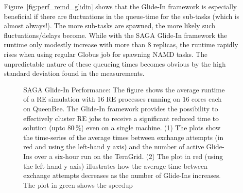 \documentclass{llncs}
\begin{document}
Figure~\ref{fig:perf_remd_glidin} shows that the Glide-In framework is
especially beneficial if there are fluctuations in the queue-time for
the sub-tasks (which is almost always!). The more sub-tasks are
spawned, the more likely such fluctuations/delays become. While with
the SAGA Glide-In framework the runtime only modestly increase with
more than 8 replicas, the runtime rapidly rises when using regular
Globus job for spawning NAMD tasks. The unpredictable nature of these
queueing times becomes obvious by the high standard deviation found in
the measurements.

\begin{figure}[htbp]
  \caption{SAGA Glide-In Performance: The figure shows the average
    runtime of a RE simulation with 16 RE processes running on 16
    cores each on QueenBee.  The Glide-In framework provides the
    possibility to effectively cluster RE jobs to receive a
    significant reduced time to solution (upto
    80\,\%) even on a single machine.
    (1) The plots show the time-series of the average times between
    exchange attempts (in red and using the left-hand y axis) and the
    number of active Glide-Ins over a six-hour run on the TeraGrid.
    (2) The plot in red (using the left-hand y axis) illustrates how
    the average time between exchange attempts decreases as the number
    of Glide-Ins increases. The plot in green shows the speedup}
\end{figure}
\end{document}
